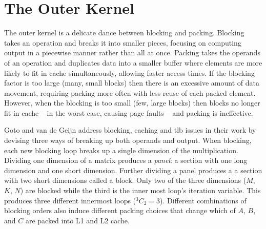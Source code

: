\documentclass[\main/thesis.tex]{subfiles}
\begin{document}
\section{The Outer Kernel}
The outer kernel is a delicate dance between blocking and packing.
Blocking takes an operation and breaks it into smaller pieces, focusing on computing output in a piecewise manner rather than all at once.
Packing takes the operands of an operation and duplicates data into a smaller buffer where elements are more likely to fit in cache simultaneously, allowing faster access times.
If the blocking factor is too large (\ie many, small blocks) then there is an excessive amount of data movement, requiring packing more often with less reuse of each packed element.
However, when the blocking is too small (\ie few, large blocks) then blocks no longer fit in cache -- in the worst case, causing page faults -- and packing is ineffective.


Goto and van de Geijn address blocking, caching and \gls{tlb} issues in their work by devising three ways of breaking up both operands and output.
When blocking, each new blocking loop breaks up a single dimension of the multiplication.
Dividing one dimension of a matrix produces a \emph{panel}: a section with one long dimension and one short dimension.
Further dividing a panel produces a a section with two short dimensions called a block.
Only two of the three dimensions ($M$, $K$, $N$) are blocked while the third is the inner most loop's iteration variable.
This produces three different innermost loops (${}^{3}C_{2}=3$).
Different combinations of blocking orders also induce different packing choices that change which of $A$, $B$, and $C$ are packed into L1 and L2 cache.
\end{document}
